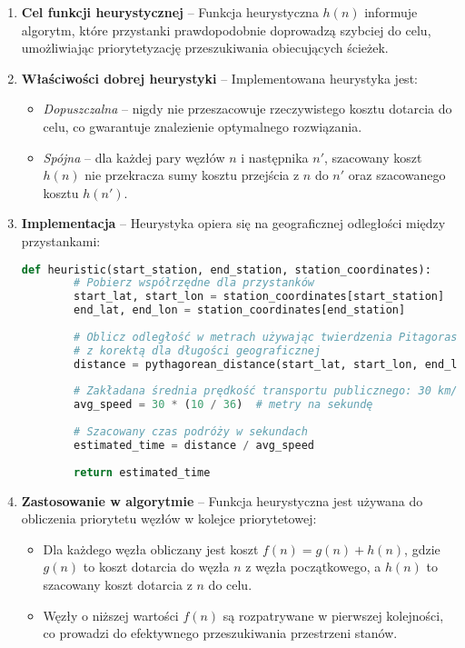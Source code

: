 \documentclass[12pt,a4paper]{article}
\begin{document}
\begin{enumerate}
    \item \textbf{Cel funkcji heurystycznej} -- Funkcja heurystyczna $h(n)$ informuje algorytm, które przystanki prawdopodobnie doprowadzą szybciej do celu, umożliwiając priorytetyzację przeszukiwania obiecujących ścieżek.
    
    \item \textbf{Właściwości dobrej heurystyki} -- Implementowana heurystyka jest:
    \begin{itemize}
        \item \textit{Dopuszczalna} -- nigdy nie przeszacowuje rzeczywistego kosztu dotarcia do celu, co gwarantuje znalezienie optymalnego rozwiązania.
        \item \textit{Spójna} -- dla każdej pary węzłów $n$ i następnika $n'$, szacowany koszt $h(n)$ nie przekracza sumy kosztu przejścia z $n$ do $n'$ oraz szacowanego kosztu $h(n')$.
    \end{itemize}
    
    \item \textbf{Implementacja} -- Heurystyka opiera się na geograficznej odległości między przystankami:
    \begin{lstlisting}[language=Python]
    def heuristic(start_station, end_station, station_coordinates):
        # Pobierz współrzędne dla przystanków
        start_lat, start_lon = station_coordinates[start_station]
        end_lat, end_lon = station_coordinates[end_station]
        
        # Oblicz odległość w metrach używając twierdzenia Pitagorasa
        # z korektą dla długości geograficznej
        distance = pythagorean_distance(start_lat, start_lon, end_lat, end_lon)
        
        # Zakładana średnia prędkość transportu publicznego: 30 km/h
        avg_speed = 30 * (10 / 36)  # metry na sekundę
        
        # Szacowany czas podróży w sekundach
        estimated_time = distance / avg_speed
        
        return estimated_time
    \end{lstlisting}
    
    \item \textbf{Zastosowanie w algorytmie} -- Funkcja heurystyczna jest używana do obliczenia priorytetu węzłów w kolejce priorytetowej:
    \begin{itemize}
        \item Dla każdego węzła obliczany jest koszt $f(n) = g(n) + h(n)$, gdzie $g(n)$ to koszt dotarcia do węzła $n$ z węzła początkowego, a $h(n)$ to szacowany koszt dotarcia z $n$ do celu.
        \item Węzły o niższej wartości $f(n)$ są rozpatrywane w pierwszej kolejności, co prowadzi do efektywnego przeszukiwania przestrzeni stanów.
    \end{itemize}
\end{enumerate}
\end{document}
